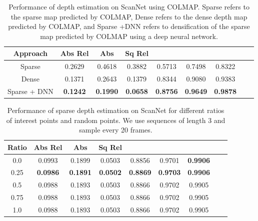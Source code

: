 \documentclass[runningheads]{llncs}
\begin{document}
\begin{table}[ht]
  \caption{Performance of depth estimation on ScanNet using COLMAP. Sparse refers to the sparse map predicted by COLMAP, Dense refers to the dense depth map predicted by COLMAP, and Sparse +DNN refers to densification of the sparse map predicted by COLMAP using a deep neural network. 
}
  \centering
\begin{tabular}{ccccccccc}
 \hline 
   Approach  &Abs Rel  &Abs & Sq Rel & \textbf{}& \textbf{}& \textbf{}\\
    \hline
Sparse &	0.2629 &	0.4618 &	0.3882 &	0.5713 &	0.7498 &	0.8322\\
\hline
Dense &	0.1371 & 0.2643 & 0.1379 & 0.8344 & 0.9080 & 0.9383  \\
Sparse + DNN  &	\textbf{0.1242} & \textbf{0.1990} & \textbf{0.0658}  &  \textbf{0.8756} & \textbf{0.9649} & \textbf{0.9878} \\

\hline
  \end{tabular}
\label{tablecolmap}
\end{table}

\begin{table}[ht]
  \caption{Performance of sparse depth estimation on ScanNet for different ratios of interest points and random points. We use sequences of length 3 and sample every 20 frames.
}
  \centering
\begin{tabular}{ccccccccc}
 \hline 
   Ratio  &Abs Rel  &Abs & Sq Rel & \textbf{}& \textbf{}& \textbf{}\\
    \hline
0.0 &	0.0993 &	0.1899 &	0.0503 &	0.8856 &	0.9701 &	\textbf{0.9906}\\
0.25 & \textbf{0.0986} &	\textbf{0.1891}&	\textbf{0.0502} &	\textbf{0.8869} &	\textbf{0.9703} &	\textbf{0.9906}\\
0.5 &	0.0988 & 0.1893 & 0.0503 &  0.8866 & 0.9702 & 0.9905 \\
0.75 &	0.0988 & 0.1893 & 0.0503  &  0.8866 & 0.9702 & 0.9905 \\
1.0 &	0.0988 & 0.1893 &0.0503  &  0.8866 & 0.9702 & 0.9905 \\
\hline
  \end{tabular}
\label{tablesparse}
\end{table}
\end{document}
